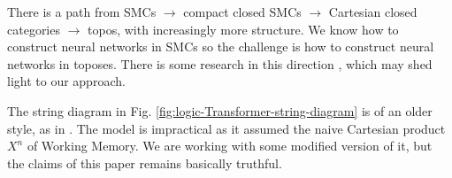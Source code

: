 \documentclass[runningheads]{llncs}
\begin{document}
There is a path from SMCs $\rightarrow$ compact closed SMCs $\rightarrow$ Cartesian closed categories $\rightarrow$ topos, with increasingly more structure. We know how to construct neural networks in SMCs so the challenge is how to construct neural networks in toposes.  There is some research in this direction \cite{Spivak2014} \cite{Gavranovic2024}, which may shed light to our approach.

The string diagram in Fig. \ref{fig:logic-Transformer-string-diagram} is of an older style, as in \cite{Khatri2024}.  The model is impractical as it assumed the naive Cartesian product $X^n$ of Working Memory.  We are working with some modified version of it, but the claims of this paper remains basically truthful.



\end{document}

